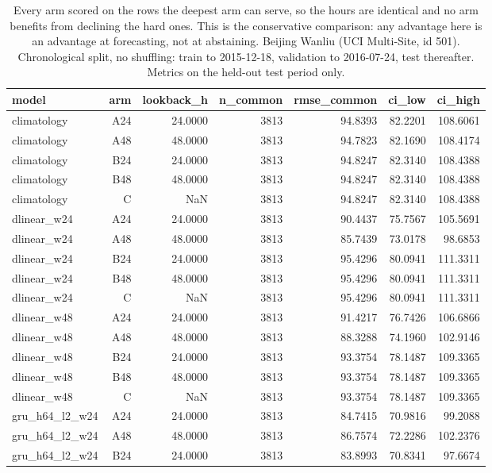 \begin{table}[htbp]
\caption{Every arm scored on the rows the deepest arm can serve, so the hours are identical and no arm benefits from declining the hard ones. This is the conservative comparison: any advantage here is an advantage at forecasting, not at abstaining. Beijing Wanliu (UCI Multi-Site, id 501). Chronological split, no shuffling: train to 2015-12-18, validation to 2016-07-24, test thereafter. Metrics on the held-out test period only.}
\label{tab:lookback_common_subset}
\begin{tabular}{lrrrrrr}
\toprule
model & arm & lookback\_h & n\_common & rmse\_common & ci\_low & ci\_high \\
\midrule
climatology & A24 & 24.0000 & 3813 & 94.8393 & 82.2201 & 108.6061 \\
climatology & A48 & 48.0000 & 3813 & 94.7823 & 82.1690 & 108.4174 \\
climatology & B24 & 24.0000 & 3813 & 94.8247 & 82.3140 & 108.4388 \\
climatology & B48 & 48.0000 & 3813 & 94.8247 & 82.3140 & 108.4388 \\
climatology & C & NaN & 3813 & 94.8247 & 82.3140 & 108.4388 \\
dlinear\_w24 & A24 & 24.0000 & 3813 & 90.4437 & 75.7567 & 105.5691 \\
dlinear\_w24 & A48 & 48.0000 & 3813 & 85.7439 & 73.0178 & 98.6853 \\
dlinear\_w24 & B24 & 24.0000 & 3813 & 95.4296 & 80.0941 & 111.3311 \\
dlinear\_w24 & B48 & 48.0000 & 3813 & 95.4296 & 80.0941 & 111.3311 \\
dlinear\_w24 & C & NaN & 3813 & 95.4296 & 80.0941 & 111.3311 \\
dlinear\_w48 & A24 & 24.0000 & 3813 & 91.4217 & 76.7426 & 106.6866 \\
dlinear\_w48 & A48 & 48.0000 & 3813 & 88.3288 & 74.1960 & 102.9146 \\
dlinear\_w48 & B24 & 24.0000 & 3813 & 93.3754 & 78.1487 & 109.3365 \\
dlinear\_w48 & B48 & 48.0000 & 3813 & 93.3754 & 78.1487 & 109.3365 \\
dlinear\_w48 & C & NaN & 3813 & 93.3754 & 78.1487 & 109.3365 \\
gru\_h64\_l2\_w24 & A24 & 24.0000 & 3813 & 84.7415 & 70.9816 & 99.2088 \\
gru\_h64\_l2\_w24 & A48 & 48.0000 & 3813 & 86.7574 & 72.2286 & 102.2376 \\
gru\_h64\_l2\_w24 & B24 & 24.0000 & 3813 & 83.8993 & 70.8341 & 97.6674 \\

\end{tabular}
\end{table}
